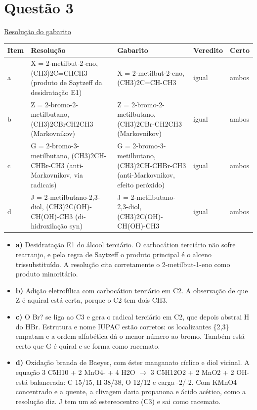\documentclass{article}%
\begin{document}
\section*{Questão 3}%
\href{https://poliedroresolve.sistemapoliedro.com.br/vestibulares/ita/2027/ita-2-fase-dia-2-21-10-2026-2-fase-dia-2/dissertativa-3-quimica-2-fase-dia-2-ita-2027}{Resolução do gabarito}\par\smallskip%
\begin{longtable}{@{}p{} p{} p{} p{} p{}@{}}\toprule Item & Resolução & Gabarito & Veredito & Certo \\ \midrule
a & X = 2{-}metilbut{-}2{-}eno, (CH3)2C=CHCH3 (produto de Saytzeff da desidratação E1) & X = 2{-}metilbut{-}2{-}eno, (CH3)2C=CH-CH3 & igual & ambos \\
b & Z = 2{-}bromo{-}2{-}metilbutano, (CH3)2CBrCH2CH3 (Markovnikov) & Z = 2{-}bromo{-}2{-}metilbutano, (CH3)2CBr-CH2CH3 (Markovnikov) & igual & ambos \\
c & G = 2{-}bromo{-}3{-}metilbutano, (CH3)2CH-CHBr-CH3 (anti{-}Markovnikov, via radicais) & G = 2{-}bromo{-}3{-}metilbutano, (CH3)2CH-CHBr-CH3 (anti{-}Markovnikov, efeito peróxido) & igual & ambos \\
d & J = 2{-}metilbutano{-}2,3{-}diol, (CH3)2C(OH)-CH(OH)-CH3 (di{-}hidroxilação syn) & J = 2{-}metilbutano{-}2,3{-}diol, (CH3)2C(OH)-CH(OH)-CH3 & igual & ambos \\
\bottomrule\end{longtable}%
\begin{itemize}%
\item%
\textbf{a)} Desidratação E1 do álcool terciário. O carbocátion terciário não sofre rearranjo, e pela regra de Saytzeff o produto principal é o alceno trissubstituído. A resolução cita corretamente o 2{-}metilbut{-}1{-}eno como produto minoritário.%
\item%
\textbf{b)} Adição eletrofílica com carbocátion terciário em C2. A observação de que Z é aquiral está certa, porque o C2 tem dois CH3.%
\item%
\textbf{c)} O Br? se liga ao C3 e gera o radical terciário em C2, que depois abstrai H do HBr. Estrutura e nome IUPAC estão corretos: os localizantes \{2,3\} empatam e a ordem alfabética dá o menor número ao bromo. Também está certo que G é quiral e se forma como racemato.%
\item%
\textbf{d)} Oxidação branda de Baeyer, com éster manganato cíclico e diol vicinal. A equação 3 C5H10 + 2 MnO4- + 4 H2O $\to$ 3 C5H12O2 + 2 MnO2 + 2 OH- está balanceada: C 15/15, H 38/38, O 12/12 e carga -2/-2. Com KMnO4 concentrado e a quente, a clivagem daria propanona e ácido acético, como a resolução diz. J tem um só estereocentro (C3) e sai como racemato.%
\end{itemize}%
\end{document}
